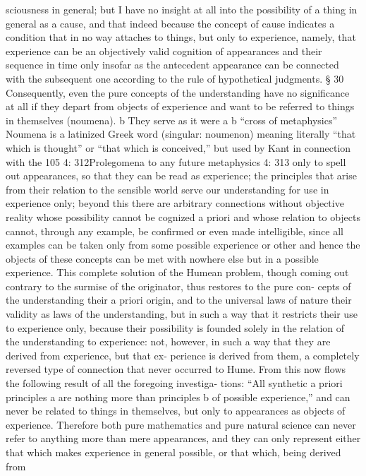 sciousness in general; but I have no insight at all into the possibility of
a thing in general as a cause, and that indeed because the concept of
cause indicates a condition that in no way attaches to things, but only to
experience, namely, that experience can be an objectively valid cognition
of appearances and their sequence in time only insofar as the antecedent
appearance can be connected with the subsequent one according to the
rule of hypothetical judgments.
§ 30
Consequently, even the pure concepts of the understanding have no
signiﬁcance at all if they depart from objects of experience and want to
be referred to things in themselves (noumena). b They serve as it were
a
b
“cross of metaphysics”
Noumena is a latinized Greek word (singular: noumenon) meaning literally “that which
is thought” or “that which is conceived,” but used by Kant in connection with the
105
4: 312Prolegomena to any future metaphysics
4: 313
only to spell out appearances, so that they can be read as experience;
the principles that arise from their relation to the sensible world serve
our understanding for use in experience only; beyond this there are
arbitrary connections without objective reality whose possibility cannot
be cognized a priori and whose relation to objects cannot, through any
example, be conﬁrmed or even made intelligible, since all examples can
be taken only from some possible experience or other and hence the
objects of these concepts can be met with nowhere else but in a possible
experience.
This complete solution of the Humean problem, though coming out
contrary to the surmise of the originator, thus restores to the pure con-
cepts of the understanding their a priori origin, and to the universal laws
of nature their validity as laws of the understanding, but in such a way
that it restricts their use to experience only, because their possibility is
founded solely in the relation of the understanding to experience: not,
however, in such a way that they are derived from experience, but that ex-
perience is derived from them, a completely reversed type of connection
that never occurred to Hume.
From this now ﬂows the following result of all the foregoing investiga-
tions: “All synthetic a priori principles a are nothing more than principles b
of possible experience,” and can never be related to things in themselves,
but only to appearances as objects of experience. Therefore both pure
mathematics and pure natural science can never refer to anything more
than mere appearances, and they can only represent either that which
makes experience in general possible, or that which, being derived from
